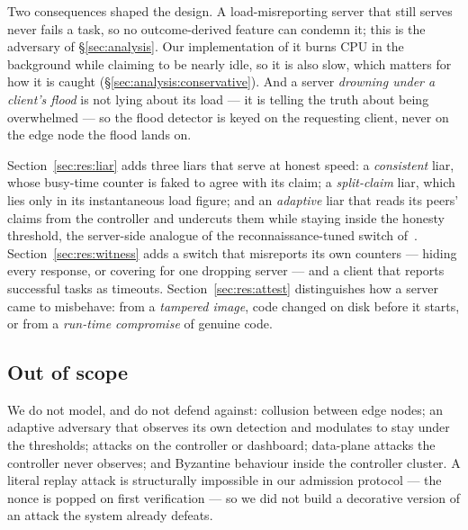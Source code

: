 \documentclass[10pt,twocolumn,letterpaper]{article}
\begin{document}
Two consequences shaped the design. A load-misreporting server that still
serves never fails a task, so no outcome-derived feature can condemn it; this
is the adversary of \S\ref{sec:analysis}. Our implementation of it burns CPU in
the background while claiming to be nearly idle, so it is also slow, which
matters for how it is caught (\S\ref{sec:analysis:conservative}). And a server \emph{drowning
under a client's flood} is not lying about its load --- it is telling the truth
about being overwhelmed --- so the flood detector is keyed on the requesting
client, never on the edge node the flood lands on.

Section~\ref{sec:res:liar} adds three liars that serve at honest speed: a
\emph{consistent} liar, whose busy-time counter is faked to agree with its
claim; a \emph{split-claim} liar, which lies only in its instantaneous load
figure; and an \emph{adaptive} liar that reads its peers' claims from the
controller and undercuts them while staying inside the honesty threshold, the
server-side analogue of the reconnaissance-tuned switch of~\cite{yu2024stealthy}.
Section~\ref{sec:res:witness} adds a switch that misreports its own counters
--- hiding every response, or covering for one dropping server --- and a
client that reports successful tasks as timeouts. Section~\ref{sec:res:attest}
distinguishes how a server came to misbehave: from a \emph{tampered image},
code changed on disk before it starts, or from a \emph{run-time compromise} of
genuine code.

\subsection{Out of scope}
We do not model, and do not defend against: collusion between edge nodes; an
adaptive adversary that observes its own detection and modulates to stay under
the thresholds; attacks on the controller or dashboard; data-plane attacks the
controller never observes; and Byzantine behaviour inside the controller
cluster. A literal replay attack is structurally impossible in our admission
protocol --- the nonce is popped on first verification --- so we did not build a
decorative version of an attack the system already defeats.
\end{document}
